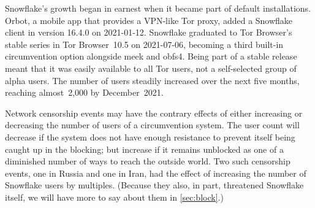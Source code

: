 \documentclass[letterpaper,twocolumn]{article}
\begin{document}
Snowflake's growth began in earnest
when it became part of default installations.
Orbot, a mobile app that provides a VPN-like Tor proxy,
added a Snowflake client in version 16.4.0
on \mbox{2021-01-12}.
Snowflake graduated to Tor Browser's stable series
in Tor Browser~10.5
on \mbox{2021-07-06},
becoming a third built-in circumvention option
alongside meek and obfs4.
Being part of a stable release meant that it was
easily available to all Tor users,
not a self-selected group of alpha users.
The number of users steadily increased
over the next five months,
reaching almost~2,000 by December~2021.

Network censorship events may have the contrary effects
of either increasing or decreasing the number of users
of a circumvention system.
The user count will decrease
if the system does not have enough resistance to prevent
itself being caught up in the blocking;
but increase if it remains unblocked as one
of a diminished number of ways to reach the outside world.
Two such censorship events,
one in Russia and one in Iran,
had the effect of increasing the number of Snowflake users
by multiples.
(Because they also, in part, threatened Snowflake itself,
we will have more to say about them in \autoref{sec:block}.)
\end{document}
